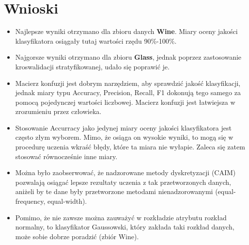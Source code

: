 \pagebreak

\section{Wnioski}
\begin{itemize}
    \item{Najlepsze wyniki otrzymano dla zbioru danych \textbf{Wine}. Miary oceny jakości
          klasyfikatora osiągały tutaj wartości rzędu 90\%-100\%.}
    \item{Najgorsze wyniki otrzymano dla zbioru \textbf{Glass}, jednak poprzez zastosowanie
            kroswalidacji stratyfikowanej, udało się poprawić je.}
    \item{Macierz konfuzji jest dobrym narzędziem, aby sprawdzić jakość klasyfikacji,
          jednak miary typu Accuracy, Precision, Recall, F1 dokonują tego samego za pomocą
          pojedynczej wartości liczbowej. Macierz konfuzji jest łatwiejsza w zrozumieniu przez
          człowieka.}
    \item{Stosowanie Accurracy jako jedynej miary oceny jakości klasyfikatora jest często złym
            wyborem. Mimo, że osiąga on wysokie wyniki, to mogą się w procedurę uczenia wkraść błędy,
            które ta miara nie wyłapie. Zaleca się zatem stosować równocześnie inne miary.}
    \item{Można było zaobserwować, że nadzorowane metody dyskretyzacji (CAIM) pozwalają osiągać
            lepsze rezultaty uczenia z tak przetworzonych danych, aniżeli by te dane były przetworzone
            metodami nienadzorowanymi (equal-frequency, equal-width).}
	\item{Pomimo, że nie zawsze można zauważyć w rozkładzie atrybutu rozkład normalny, to
	        klasyfikator Gaussowski, który zakłada taki rozkład danych, może sobie dobrze poradzić (zbiór Wine).}
\end{itemize}
